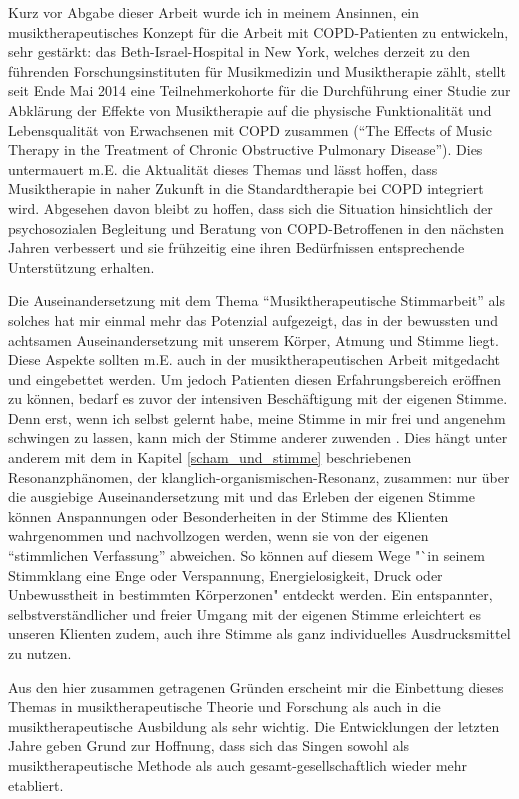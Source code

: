 Kurz vor Abgabe dieser Arbeit wurde ich in meinem Ansinnen, ein musiktherapeutisches Konzept für die Arbeit mit COPD-Patienten zu entwickeln, sehr gestärkt: das Beth-Israel-Hospital in New York, welches derzeit zu den führenden Forschungsinstituten für Musikmedizin und Musiktherapie zählt, stellt seit Ende Mai 2014 eine Teilnehmerkohorte für die Durchführung einer Studie zur Abklärung der Effekte von Musiktherapie auf die physische Funktionalität und Lebensqualität von Erwachsenen mit COPD zusammen ("`The Effects of Music Therapy in the Treatment of Chronic Obstructive Pulmonary Disease"'). Dies untermauert m.E. die Aktualität dieses Themas und lässt hoffen, dass Musiktherapie in naher Zukunft in die Standardtherapie bei COPD integriert wird. Abgesehen davon bleibt zu hoffen, dass sich die Situation hinsichtlich der psychosozialen Begleitung und Beratung von COPD-Betroffenen in den nächsten Jahren verbessert und sie frühzeitig eine ihren Bedürfnissen entsprechende Unterstützung erhalten.

Die Auseinandersetzung mit dem Thema "`Musiktherapeutische Stimmarbeit"' als solches hat mir einmal mehr das Potenzial aufgezeigt, das in der bewussten und achtsamen Auseinandersetzung mit unserem Körper, Atmung und Stimme liegt.
Diese Aspekte sollten m.E. auch in der musiktherapeutischen Arbeit mitgedacht und eingebettet werden. Um jedoch Patienten diesen Erfahrungsbereich eröffnen zu können, bedarf es zuvor der intensiven Beschäftigung mit der eigenen Stimme. Denn erst, wenn ich selbst gelernt habe, meine Stimme in mir frei und angenehm schwingen zu lassen, kann mich der Stimme anderer zuwenden \autocite[vgl.][15]{mcmurtry2012}. 
Dies hängt unter anderem mit dem in Kapitel \ref{scham_und_stimme} beschriebenen Resonanzphänomen, der klanglich-organismischen-Resonanz, zusammen: nur über die ausgiebige Auseinandersetzung mit und das Erleben der eigenen Stimme können Anspannungen oder Besonderheiten in der Stimme des Klienten wahrgenommen und nachvollzogen werden, wenn sie von der eigenen "`stimmlichen Verfassung"' abweichen. 
So können auf diesem Wege "`in seinem Stimmklang eine Enge oder Verspannung, Energielosigkeit, Druck oder Unbewusstheit in bestimmten Körperzonen" \autocite[16]{mcmurtry2012} entdeckt werden. 
Ein entspannter, selbstverständlicher und freier Umgang mit der eigenen Stimme erleichtert es unseren Klienten zudem, auch ihre Stimme als ganz individuelles Ausdrucksmittel zu nutzen.

Aus den hier zusammen getragenen Gründen erscheint mir die Einbettung dieses Themas in musiktherapeutische Theorie und Forschung als auch in die musiktherapeutische Ausbildung als sehr wichtig. Die Entwicklungen der letzten Jahre geben Grund zur Hoffnung, dass sich das Singen sowohl als musiktherapeutische Methode als auch gesamt-gesellschaftlich wieder mehr etabliert.


\newpage\thispagestyle{empty}
